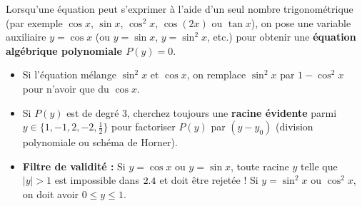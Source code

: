 Lorsqu'une équation peut s'exprimer à l'aide d'un seul nombre trigonométrique (par exemple $\cos x$, $\sin x$, $\cos^2 x$, $\cos(2x)$ ou $\tan x$), on pose une variable auxiliaire $y = \cos x$ (ou $y = \sin x$, $y = \sin^2 x$, etc.) pour obtenir une \textbf{équation algébrique polynomiale $P(y) = 0$}.
\begin{itemize}
    \item Si l'équation mélange $\sin^2 x$ et $\cos x$, on remplace $\sin^2 x$ par $1 - \cos^2 x$ pour n'avoir que du $\cos x$.
    \item Si $P(y)$ est de degré 3, cherchez toujours une \textbf{racine évidente} parmi $y \in \{1, -1, 2, -2, \frac{1}{2}\}$ pour factoriser $P(y)$ par $(y - y_0)$ (division polynomiale ou schéma de Horner).
    \item \textbf{Filtre de validité :} Si $y = \cos x$ ou $y = \sin x$, toute racine $y$ telle que $|y| > 1$ est impossible dans $2.4$ et doit être rejetée ! Si $y = \sin^2 x$ ou $\cos^2 x$, on doit avoir $0 \le y \le 1$.
\end{itemize}

